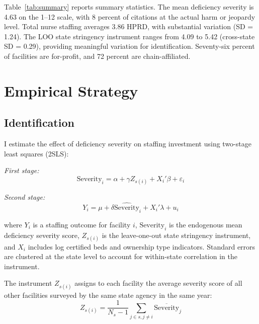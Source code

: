 \documentclass[12pt]{article}
\begin{document}


Table~\ref{tab:summary} reports summary statistics. The mean deficiency severity is 4.63 on the 1--12 scale, with 8 percent of citations at the actual harm or jeopardy level. Total nurse staffing averages 3.86 HPRD, with substantial variation (SD = 1.24). The LOO state stringency instrument ranges from 4.09 to 5.42 (cross-state SD = 0.29), providing meaningful variation for identification. Seventy-six percent of facilities are for-profit, and 72 percent are chain-affiliated.

\section{Empirical Strategy}

\subsection{Identification}

I estimate the effect of deficiency severity on staffing investment using two-stage least squares (2SLS):

\textit{First stage:}
\begin{equation}
\text{Severity}_i = \alpha + \gamma Z_{s(i)} + X_i'\beta + \varepsilon_i
\label{eq:first_stage}
\end{equation}

\textit{Second stage:}
\begin{equation}
Y_i = \mu + \delta \widehat{\text{Severity}}_i + X_i'\lambda + u_i
\label{eq:second_stage}
\end{equation}

\noindent where $Y_i$ is a staffing outcome for facility $i$, $\text{Severity}_i$ is the endogenous mean deficiency severity score, $Z_{s(i)}$ is the leave-one-out state stringency instrument, and $X_i$ includes log certified beds and ownership type indicators. Standard errors are clustered at the state level to account for within-state correlation in the instrument.

The instrument $Z_{s(i)}$ assigns to each facility the average severity score of all other facilities surveyed by the same state agency in the same year:
\begin{equation}
Z_{s(i)} = \frac{1}{N_s - 1} \sum_{j \in s, j \neq i} \overline{\text{Severity}}_j
\end{equation}
\end{document}
